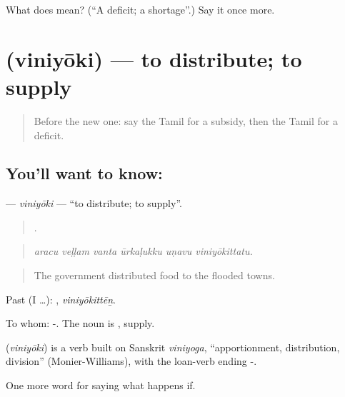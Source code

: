 \begin{tcolorbox}[breakable,colback=teal!4,colframe=teal!35!black,title={Before you move on}]
What does  mean? (\textquotedblleft{}A deficit; a shortage\textquotedblright{}.) Say it once more.
\end{tcolorbox}
\section[\texorpdfstring{\ta{விநியோகி} (viniyōki)}{விநியோகி (viniyōki)}]{ (viniyōki) — to distribute; to supply}

\label{lesson:TA-C391-viniyoki}



\begin{quote}
Before the new one: say the Tamil for a subsidy, then the Tamil for a deficit.
\end{quote}

\subsection*{You'll want to know: }
\textbf{} — \emph{viniyōki} — \textquotedblleft{}to distribute; to supply\textquotedblright{}.

\begin{quote}
     .
\end{quote}

\begin{quote}
\emph{aracu veḷḷam vanta ūrkaḷukku uṇavu viniyōkittatu.}
\end{quote}

\begin{quote}
The government distributed food to the flooded towns.
\end{quote}

Past (I …): , \emph{viniyōkittēṉ}.

To whom: -. The noun is , supply.

\begin{cousinweb}
\textbf{} (\emph{viniyōki}) is a verb built on Sanskrit \emph{viniyoga}, \textquotedblleft{}apportionment, distribution, division\textquotedblright{} (Monier-Williams), with the loan-verb ending -.
\end{cousinweb}

\begin{grammarlens}[title={What you've built}]
One more word for saying what happens if.
\end{grammarlens}

